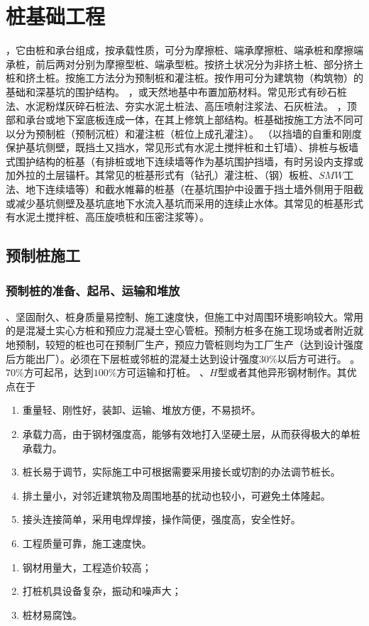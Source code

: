 \documentclass{book}
\begin{document}
\chapter{桩基础工程}
，它由桩和承台组成，按承载性质，可分为摩擦桩、端承摩擦桩、端承桩和摩擦端承桩，前后两对分别为摩擦型桩、端承型桩。按挤土状况分为非挤土桩、部分挤土桩和挤土桩。按施工方法分为预制桩和灌注桩。按作用可分为建筑物（构筑物）的基础和深基坑的围护结构。
，或天然地基中布置加筋材料。常见形式有砂石桩法、水泥粉煤灰碎石桩法、夯实水泥土桩法、高压喷射注浆法、石灰桩法。
，顶部和承台或地下室底板连成一体，在其上修筑上部结构。桩基础按施工方法不同可以分为预制桩（预制沉桩）和灌注桩（桩位上成孔灌注）。
（以挡墙的自重和刚度保护基坑侧壁，既挡土又挡水，常见形式有水泥土搅拌桩和土钉墙）、排桩与板墙式围护结构的桩基（有排桩或地下连续墙等作为基坑围护挡墙，有时另设内支撑或加外拉的土层锚杆。其常见的桩基形式有（钻孔）灌注桩、（钢）板桩、$SMW$工法、地下连续墙等）和截水帷幕的桩基（在基坑围护中设置于挡土墙外侧用于阻截或减少基坑侧壁及基坑底地下水流入基坑而采用的连续止水体。其常见的桩基形式有水泥土搅拌桩、高压旋喷桩和压密注浆等）。
\section{预制桩施工}
\subsection{预制桩的准备、起吊、运输和堆放}
、坚固耐久、桩身质量易控制、施工速度快，但施工中对周围环境影响较大。常用的是混凝土实心方桩和预应力混凝土空心管桩。预制方桩多在施工现场或者附近就地预制，较短的桩也可在预制厂生产，预应力管桩则均为工厂生产（达到设计强度后方能出厂）。必须在下层桩或邻桩的混凝土达到设计强度$30\%$以后方可进行。
。
$70\%$方可起吊，达到$100\%$方可运输和打桩。
、$H$型或者其他异形钢材制作。其优点在于
\begin{enumerate}
    \item 重量轻、刚性好，装卸、运输、堆放方便，不易损坏。
    \item 承载力高，由于钢材强度高，能够有效地打入坚硬土层，从而获得极大的单桩承载力。
    \item 桩长易于调节，实际施工中可根据需要采用接长或切割的办法调节桩长。
    \item 排土量小，对邻近建筑物及周围地基的扰动也较小，可避免土体隆起。
    \item 接头连接简单，采用电焊焊接，操作简便，强度高，安全性好。
    \item 工程质量可靠，施工速度快。
\end{enumerate}
\begin{enumerate}
    \item 钢材用量大，工程造价较高；
    \item 打桩机具设备复杂，振动和噪声大；
    \item 桩材易腐蚀。
\end{enumerate}
\end{document}

